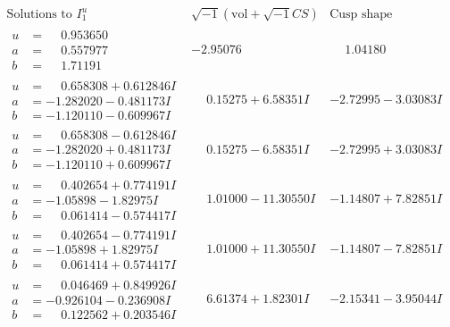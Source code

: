 \documentclass[1p]{elsarticle_modified}
\theoremstyle{definition}
\newcommand{\I}{\sqrt{-1}}
\begin{document}
$$\begin{array}{c|c|c}  
\text{Solutions to }I^u_{1}& \I (\text{vol} + \sqrt{-1}CS) & \text{Cusp shape}\\
 \hline 
\begin{aligned}
u &= \phantom{-}0.953650\phantom{ +0.000000I} \\
a &= \phantom{-}0.557977\phantom{ +0.000000I} \\
b &= \phantom{-}1.71191\phantom{ +0.000000I}\end{aligned}
 & -2.95076\phantom{ +0.000000I} & \phantom{-}1.04180\phantom{ +0.000000I} \\ \hline\begin{aligned}
u &= \phantom{-}0.658308 + 0.612846 I \\
a &= -1.282020 - 0.481173 I \\
b &= -1.120110 - 0.609967 I\end{aligned}
 & \phantom{-}0.15275 + 6.58351 I & -2.72995 - 3.03083 I \\ \hline\begin{aligned}
u &= \phantom{-}0.658308 - 0.612846 I \\
a &= -1.282020 + 0.481173 I \\
b &= -1.120110 + 0.609967 I\end{aligned}
 & \phantom{-}0.15275 - 6.58351 I & -2.72995 + 3.03083 I \\ \hline\begin{aligned}
u &= \phantom{-}0.402654 + 0.774191 I \\
a &= -1.05898 - 1.82975 I \\
b &= \phantom{-}0.061414 - 0.574417 I\end{aligned}
 & \phantom{-}1.01000 - 11.30550 I & -1.14807 + 7.82851 I \\ \hline\begin{aligned}
u &= \phantom{-}0.402654 - 0.774191 I \\
a &= -1.05898 + 1.82975 I \\
b &= \phantom{-}0.061414 + 0.574417 I\end{aligned}
 & \phantom{-}1.01000 + 11.30550 I & -1.14807 - 7.82851 I \\ \hline\begin{aligned}
u &= \phantom{-}0.046469 + 0.849926 I \\
a &= -0.926104 - 0.236908 I \\
b &= \phantom{-}0.122562 + 0.203546 I\end{aligned}
 & \phantom{-}6.61374 + 1.82301 I & -2.15341 - 3.95044 I \\ \hline\begin{aligned}

\end{aligned}
\end{array}$$
\end{document}
